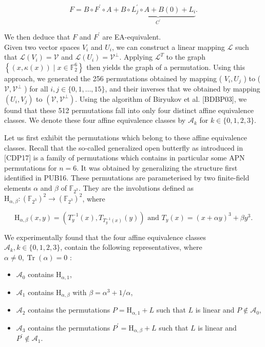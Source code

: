 \documentclass[10pt]{article}
\begin{document}
$$
F=B \circ F^{\prime} \circ A+\underbrace{B \circ L_{j}^{\prime} \circ A+B(0)+L_{i}}_{C^{\prime}} .
$$

We then deduce that $F$ and $F^{\prime}$ are EA-equivalent.\\
Given two vector spaces $V_{i}$ and $U_{i}$, we can construct a linear mapping $\mathcal{L}$ such that $\mathcal{L}\left(V_{i}\right)=\mathcal{V}$ and $\mathcal{L}\left(U_{i}\right)=\mathcal{V}^{\perp}$. Applying $\mathcal{L}^{T}$ to the graph $\left\{(x, \kappa(x)) \mid x \in \mathbb{F}_{2}^{6}\right\}$ then yields the graph of a permutation. Using this approach, we generated the 256 permutations obtained by mapping ( $V_{i}, U_{j}$ ) to ( $\mathcal{V}, \mathcal{V}^{\perp}$ ) for all $i, j \in\{0,1, \ldots, 15\}$, and their inverses that we obtained by mapping $\left(U_{i}, V_{j}\right)$ to $\left(\mathcal{V}, \mathcal{V}^{\perp}\right)$. Using the algorithm of Biryukov et al. [BDBP03], we found that these 512 permutations fall into only four distinct affine equivalence classes. We denote these four affine equivalence classes by $\mathcal{A}_{k}$ for $k \in\{0,1,2,3\}$.

Let us first exhibit the permutations which belong to these affine equivalence classes. Recall that the so-called generalized open butterfly as introduced in [CDP17] is a family of permutations which contains in particular some APN permutations for $n=6$. It was obtained by generalizing the structure first identified in PUB16. These permutations are parameterised by two finite-field elements $\alpha$ and $\beta$ of $\mathbb{F}_{2^{3}}$. They are the involutions defined as $\mathrm{H}_{\alpha, \beta}:\left(\mathbb{F}_{2^{3}}\right)^{2} \rightarrow\left(\mathbb{F}_{2^{3}}\right)^{2}$, where

$$
\mathrm{H}_{\alpha, \beta}(x, y)=\left(T_{y}^{-1}(x), T_{T_{y}^{-1}(x)}(y)\right) \text { and } T_{y}(x)=(x+\alpha y)^{3}+\beta y^{3} .
$$

We experimentally found that the four affine equivalence classes $\mathcal{A}_{k}, k \in\{0,1,2,3\}$, contain the following representatives, where $\alpha \neq 0, \operatorname{Tr}(\alpha)=0$ :

\begin{itemize}
  \item $\mathcal{A}_{0}$ contains $\mathrm{H}_{\alpha, 1}$,
  \item $\mathcal{A}_{1}$ contains $\mathrm{H}_{\alpha, \beta}$ with $\beta=\alpha^{3}+1 / \alpha$,
  \item $\mathcal{A}_{2}$ contains the permutations $P=\mathrm{H}_{\alpha, 1}+L$ such that $L$ is linear and $P \notin \mathcal{A}_{0}$,
  \item $\mathcal{A}_{3}$ contains the permutations $P^{\prime}=\mathrm{H}_{\alpha, \beta}+L$ such that $L$ is linear and $P^{\prime} \notin \mathcal{A}_{1}$.
\end{itemize}
\end{document}
